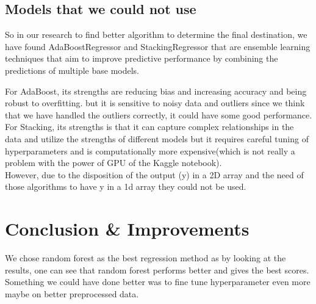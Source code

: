 \documentclass[12pt, titlepage]{article}
\begin{document}
\subsection{Models that we could not use}

So in our research to find better algorithm to determine the final destination, we have found AdaBoostRegressor and StackingRegressor that are ensemble learning techniques that aim to improve predictive performance by combining the predictions of multiple base models.

For AdaBoost, its strengths are reducing bias and increasing accuracy and being robust to overfitting.
but it is sensitive to noisy data and outliers since we think that we have handled the outliers correctly, it could have some good performance.\\

For Stacking, its strengths is that it can capture complex relationships in the data and utilize the strengths of different models but it requires careful tuning of hyperparameters and is computationally more expensive(which is not really a problem with the power of GPU of the Kaggle notebook).\\

However, due to the disposition of the output (y) in a 2D array and the need of those algorithms to have y in a 1d array they could not be used.


\section{Conclusion \& Improvements}
We chose random forest as the best regression method as by looking at the results, one can see that random forest performs better and gives the best scores. Something we could have done better was to fine tune hyperparameter even more maybe on better preprocessed data.
\end{document}
